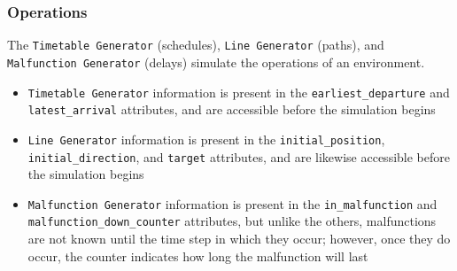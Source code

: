 \subsubsection{Operations}
The \texttt{Timetable Generator} (schedules), \texttt{Line Generator} (paths), and \texttt{Malfunction Generator} (delays) simulate the operations of an environment.
{\small
\begin{itemize}
	\item \texttt{Timetable Generator} information is present in the \texttt{earliest\_departure} and \texttt{latest\_arrival} attributes, and are accessible before the simulation begins
	\item \texttt{Line Generator} information is present in the \texttt{initial\_position}, \texttt{initial\_direction}, and \texttt{target} attributes, and are likewise accessible before the simulation begins
	\item \texttt{Malfunction Generator} information is present in the \texttt{in\_malfunction} and \\ \texttt{malfunction\_down\_counter} attributes, but unlike the others, malfunctions are not known until the time step in which they occur; however, once they do occur, the counter indicates how long the malfunction will last
\end{itemize}
}



